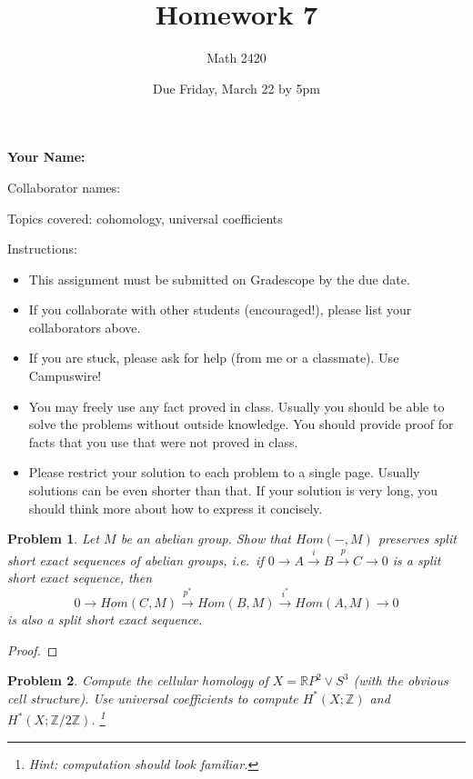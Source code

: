\documentclass[11pt]{article}
\author{Math 2420}
\date{Due Friday, March 22 by 5pm}
\title{Homework 7}
\newtheorem{problem}{Problem}
\begin{document}
\maketitle

{\bf\Large Your Name:} 

Collaborator names: 


\vspace{.3in}
Topics covered: cohomology, universal coefficients

Instructions: 
\begin{itemize}
\item This assignment must be submitted on Gradescope by the due date. 
\item If you collaborate with other students (encouraged!), please list your collaborators above. 
\item If you are stuck, please ask for help (from me or a classmate). Use Campuswire!  
\item You may freely use any fact proved in class. Usually you should be able to solve the problems without outside knowledge. You should provide proof for facts that you use that were not proved in class. 
\item Please restrict your solution to each problem to a single page. Usually solutions can be even shorter than that. If your solution is very long, you should think more about how to express it concisely.
\end{itemize}
\pagebreak 





\begin{problem}
Let $M$ be an abelian group. Show that $Hom(-,M)$ preserves split short exact sequences of abelian groups, i.e.\ if $0\rightarrow A\xrightarrow{i}B\xrightarrow{p}C\rightarrow0$ is a split short exact sequence, then 
\[0\rightarrow Hom(C,M)\xrightarrow{p^*} Hom(B,M)\xrightarrow{i^*} Hom(A,M)\rightarrow0\]
is also a split short exact sequence. 
\end{problem} 

\begin{proof}

\end{proof}

\pagebreak 

\begin{problem}
Compute the cellular homology of $X=\mathbb RP^2\vee S^3$ (with the obvious cell structure). Use universal coefficients to compute $H^*(X;\mathbb Z)$ and $H^*(X;\mathbb Z/2\mathbb Z)$. \footnote{Hint: computation should look familiar.} 
\end{problem}
\end{document}
